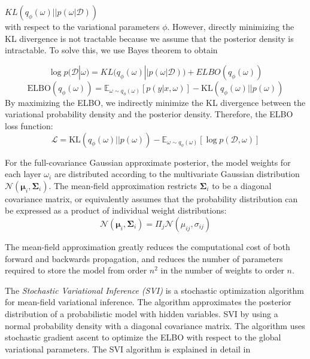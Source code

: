 \documentclass[11pt,a4paper]{article}
\begin{document}
\begin{math}
    KL(q_{\phi}(\omega)||p(\omega|\mathcal{D}))
\end{math} \\
with respect to the variational parameters $\phi$. However, directly minimizing the KL divergence is not tractable because we assume that the posterior density is intractable. To solve this, we use Bayes theorem to obtain

\begin{equation}
    \log p(\mathcal{D}|\omega) = KL\big(q_{\phi}(\omega)||p(\omega|\mathcal{D})\big) + ELBO(q_{\phi}(\omega))
\end{equation}
\begin{equation}
        \text{ELBO}(q_{\phi}(\omega)) = \mathbb{E}_{\omega \sim q_{\phi}(\omega)}[ p(y|x,\omega)] - \text{KL}(q_{\phi}(\omega) || p(\omega))
\end{equation}
By maximizing the ELBO, we indirectly minimize the KL divergence between the variational probability density and the posterior density. Therefore, the ELBO loss function:
\begin{equation}
    \mathcal{L} = \text{KL}(q_{\phi}(\omega) || p(\omega) ) - \mathbb{E}_{\omega \sim q_{\phi}(\omega)}[\log p(\mathcal{D},\omega) ]
\end{equation}

For the full-covariance Gaussian approximate posterior, the model weights for each layer $\omega_i$ are distributed according to the multivariate Gaussian distribution $\mathcal{N}(\bm{\mu}_i, \bm{\Sigma}_i)$. The mean-field approximation restricts $\bm{\Sigma}_i$ to be a diagonal covariance matrix, or equivalently assumes that the probability distribution can be expressed as a product of individual weight distributions:
\begin{equation}
    \mathcal{N}(\bm{\mu}_i, \bm{\Sigma}_i) = \Pi_j \mathcal{N}(\mu_{ij}, \sigma_{ij})
\end{equation}

The mean-field approximation greatly reduces the computational cost of both forward and backwards propagation, and reduces the number of parameters required to store the model from order $n^2$ in the number of weights to order $n$.

The \textit{Stochastic Variational Inference (SVI)} is a stochastic optimization algorithm for mean-field variational inference. The algorithm approximates the posterior distribution of a probabilistic model with hidden variables. SVI by using a normal probability density with a diagonal covariance matrix. The algorithm uses stochastic gradient ascent to optimize the ELBO with respect to the global variational parameters. The SVI algorithm is explained in detail in \cite{hoffman}
\end{document}
